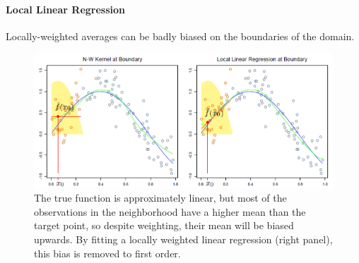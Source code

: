 \paragraph{Local Linear Regression}
Locally-weighted averages can be badly biased on the boundaries of the domain.
\begin{figure}[H]
	\begin{center}
		\includegraphics[width=\textwidth]{./chap/1chap/3sec/8images/4_localReg.PNG}
	\end{center}
	\caption{The true function is approximately linear, but most of the observations in the
	neighborhood have a higher mean than the target point, so despite weighting, their mean
	will be biased upwards. By fitting a locally weighted linear regression (right panel), this
	bias is removed to first order.}
	\label{fig:4_localReg}
\end{figure}

